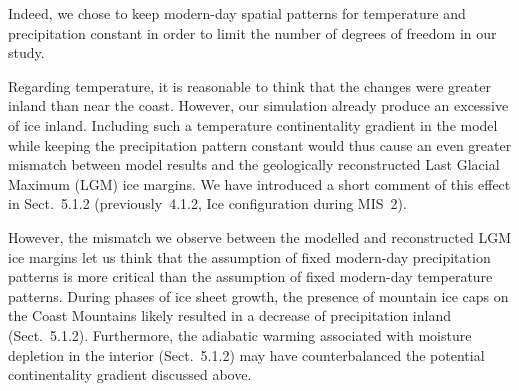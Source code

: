 
Indeed, we chose to keep modern-day spatial patterns for temperature and
precipitation constant in order to limit the number of degrees of freedom in
our study.

Regarding temperature, it is reasonable to think that the changes were greater
inland than near the coast. However, our simulation already produce an
excessive of ice inland. Including such a temperature continentality gradient
in the model while keeping the precipitation pattern constant would thus cause
an even greater mismatch between model results and the geologically
reconstructed Last Glacial Maximum (LGM) ice margins. We have introduced a
short comment of this effect in Sect.~5.1.2 (previously~4.1.2, Ice
configuration during MIS~2).

However, the mismatch we observe between the modelled and reconstructed LGM ice
margins let us think that the assumption of fixed modern-day precipitation
patterns is more critical than the assumption of fixed modern-day temperature
patterns. During phases of ice sheet growth, the presence of mountain ice caps
on the Coast Mountains likely resulted in a decrease of precipitation inland
(Sect.~5.1.2). Furthermore, the adiabatic warming associated with moisture
depletion in the interior (Sect.~5.1.2) may have counterbalanced the potential
continentality gradient discussed above.


